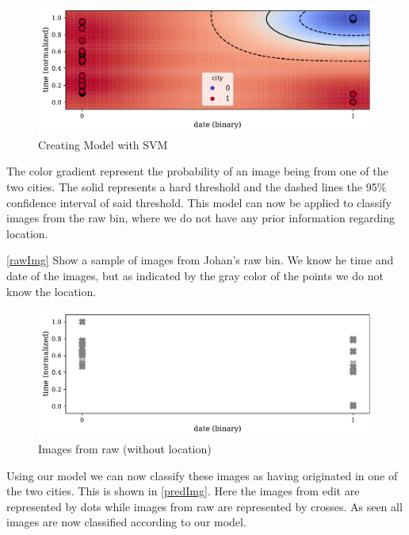 \documentclass[a4paper]{article}
\begin{document}
\begin{figure}[!htb]
	\centering
	\caption{Creating Model with SVM}\label{svmImg}
	\includegraphics[scale=0.65]{svm_edit_img.pdf}
\end{figure}

The color gradient represent the probability of an image being from one of the two cities. The solid represents a hard threshold and the dashed lines the 95\% confidence interval of said threshold. This model can now be applied to classify images from the raw bin, where we do not have any prior information regarding location.\par

\autoref{rawImg} Show a sample of images from Johan's raw bin. We know he time and date of the images, but as indicated by the gray color of the points we do not know the location.\par

\begin{figure}[!htb]
	\centering
	\caption{Images from raw (without location)}\label{rawImg}
	\includegraphics[scale=0.65]{raw_img.pdf}
\end{figure}

Using our model we can now classify these images as having originated in one of the two cities. This is shown in \autoref{predImg}. Here the images from edit are represented by dots while images from raw are represented by crosses. As seen all images are now classified according to our model.\par
\end{document}
